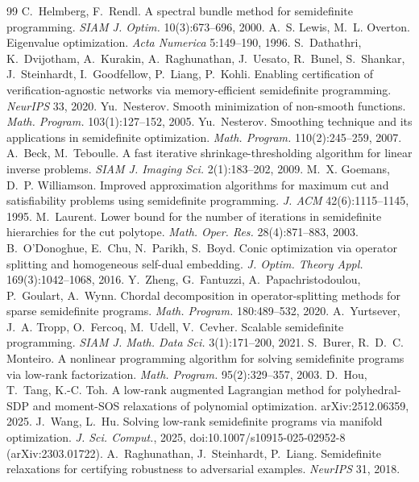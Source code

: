 \documentclass[a4paper,11pt]{article}
\theoremstyle{plain}
\theoremstyle{definition}
\theoremstyle{remark}
\begin{document}
\begin{thebibliography}{99}
 C.~Helmberg, F.~Rendl. A spectral bundle method for semidefinite programming. \emph{SIAM J. Optim.} 10(3):673--696, 2000.
 A.~S. Lewis, M.~L. Overton. Eigenvalue optimization. \emph{Acta Numerica} 5:149--190, 1996.
 S.~Dathathri, K.~Dvijotham, A.~Kurakin, A.~Raghunathan, J.~Uesato, R.~Bunel, S.~Shankar, J.~Steinhardt, I.~Goodfellow, P.~Liang, P.~Kohli. Enabling certification of verification-agnostic networks via memory-efficient semidefinite programming. \emph{NeurIPS} 33, 2020.
 Yu.~Nesterov. Smooth minimization of non-smooth functions. \emph{Math. Program.} 103(1):127--152, 2005.
 Yu.~Nesterov. Smoothing technique and its applications in semidefinite optimization. \emph{Math. Program.} 110(2):245--259, 2007.
 A.~Beck, M.~Teboulle. A fast iterative shrinkage-thresholding algorithm for linear inverse problems. \emph{SIAM J. Imaging Sci.} 2(1):183--202, 2009.
 M.~X. Goemans, D.~P. Williamson. Improved approximation algorithms for maximum cut and satisfiability problems using semidefinite programming. \emph{J. ACM} 42(6):1115--1145, 1995.
 M.~Laurent. Lower bound for the number of iterations in semidefinite hierarchies for the cut polytope. \emph{Math. Oper. Res.} 28(4):871--883, 2003.
 B.~O'Donoghue, E.~Chu, N.~Parikh, S.~Boyd. Conic optimization via operator splitting and homogeneous self-dual embedding. \emph{J. Optim. Theory Appl.} 169(3):1042--1068, 2016.
 Y.~Zheng, G.~Fantuzzi, A.~Papachristodoulou, P.~Goulart, A.~Wynn. Chordal decomposition in operator-splitting methods for sparse semidefinite programs. \emph{Math. Program.} 180:489--532, 2020.
 A.~Yurtsever, J.~A. Tropp, O.~Fercoq, M.~Udell, V.~Cevher. Scalable semidefinite programming. \emph{SIAM J. Math. Data Sci.} 3(1):171--200, 2021.
 S.~Burer, R.~D.~C. Monteiro. A nonlinear programming algorithm for solving semidefinite programs via low-rank factorization. \emph{Math. Program.} 95(2):329--357, 2003.
 D.~Hou, T.~Tang, K.-C. Toh. A low-rank augmented Lagrangian method for polyhedral-SDP and moment-SOS relaxations of polynomial optimization. arXiv:2512.06359, 2025.
 J.~Wang, L.~Hu. Solving low-rank semidefinite programs via manifold optimization. \emph{J. Sci. Comput.}, 2025, doi:10.1007/s10915-025-02952-8 (arXiv:2303.01722).
 A.~Raghunathan, J.~Steinhardt, P.~Liang. Semidefinite relaxations for certifying robustness to adversarial examples. \emph{NeurIPS} 31, 2018.

\end{thebibliography}
\end{document}
